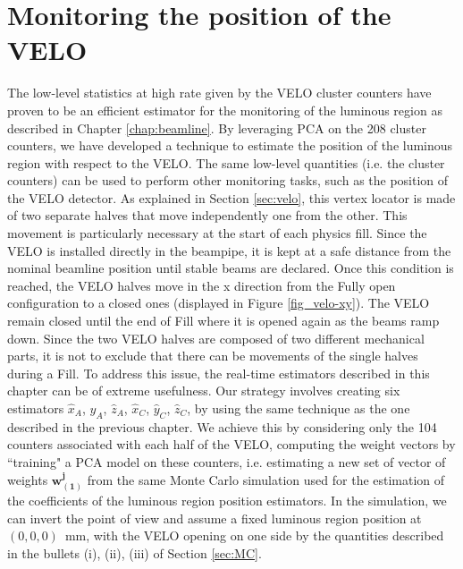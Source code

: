 \chapter{Monitoring the position of the VELO}
\label{chap:pos_VELO}
The low-level statistics at high rate given by the VELO cluster counters have proven to be an efficient estimator for the monitoring of the luminous region as described in Chapter \ref{chap:beamline}. By leveraging PCA on the 208 cluster counters, we have developed a technique to estimate the position of the luminous region with respect to the VELO. The same low-level quantities (i.e. the cluster counters) can be used to perform other monitoring tasks, such as the position of the VELO detector. As explained in Section \ref{sec:velo}, this vertex locator is made of two separate halves that move independently one from the other. This movement is particularly necessary at the start of each physics fill. Since the VELO is installed directly in the beampipe, it is kept at a safe distance from the nominal beamline position until stable beams are declared. Once this condition is reached, the VELO halves move in the x direction from the Fully open configuration to a closed ones (displayed in Figure \ref{fig_velo-xy}). The VELO remain closed until the end of Fill where it is opened again as the beams ramp down. Since the two VELO halves are composed of two different mechanical parts, it is not to exclude that there can be movements of the single halves during a Fill. To address this issue, the real-time estimators described in this chapter can be of extreme usefulness. 
Our strategy involves creating six estimators $\hat{x}_A$, $\hat{y}_A$, $\hat{z}_A$, $\hat{x}_C$, $\hat{y}_C$, $\hat{z}_C$, by using the same technique as the one described in the previous chapter. We achieve this by considering only the 104 counters associated with each half of the VELO, computing the weight vectors by ``training" a PCA model on these counters, i.e. estimating a new set of vector of weights $\mathbf{w^j_(1)}$ from the same Monte Carlo simulation used for the estimation of the coefficients of the luminous region position estimators.
In the simulation, we can invert the point of view and assume a fixed luminous region position at $(0,0,0)$~mm, with the VELO opening on one side by the quantities described in the bullets (i), (ii), (iii) of Section \ref{sec:MC}. 


